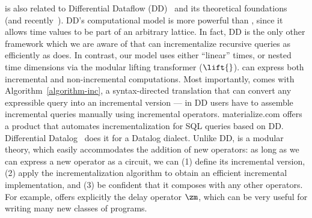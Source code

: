 \dbsp is also related to Differential Dataflow
(DD)~\cite{mcsherry-cidr13, murray-sosp13} and its theoretical
foundations~\cite{abadi-fossacs15} (and
recently~\cite{mcsherry-vldb20,chothia-vldb16}).  DD's computational
model is more powerful than \dbsp, since it allows time values to be
part of an arbitrary lattice.  In fact, DD is the only other framework
which we are aware of that can incrementalize recursive queries as
efficiently as \dbsp does.  In contrast, our model uses either
``linear'' times, or nested time dimensions via the modular lifting
transformer ($\lift{}$).  \dbsp can express both incremental and
non-incremental computations.  Most importantly, \dbsp comes with
Algorithm~\ref{algorithm-inc}, a syntax-directed translation that can
convert any expressible query into an incremental version --- in DD
users have to assemble incremental queries manually using incremental
operators.  materialize.com offers a product that automates
incrementalization for SQL queries based on DD.  Differential
Datalog~\cite{ryzhyk-datalog19} does it for a Datalog dialect.  Unlike
DD, \dbsp is a modular theory, which easily accommodates the addition
of new operators: as long as we can express a new operator as a \dbsp
circuit, we can (1) define its incremental version, (2) apply the
incrementalization algorithm to obtain an efficient incremental
implementation, and (3) be confident that it composes with any other
operators.  For example, \dbsp offers explicitly the delay operator
$\zm$, which can be very useful for writing many new classes of
programs.

